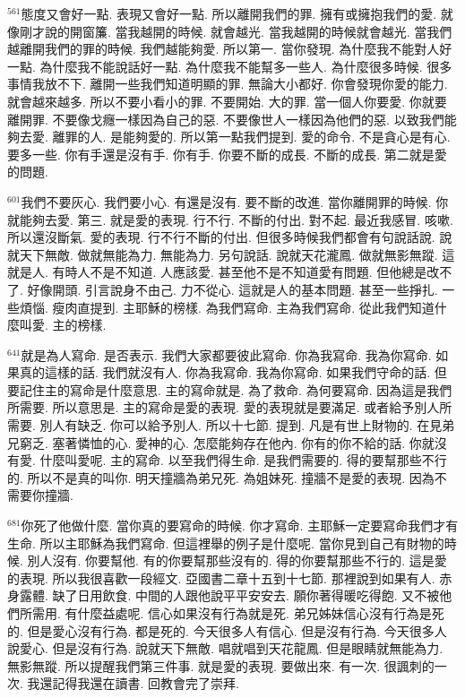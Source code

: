 \documentclass{book}
\begin{document}
$^{561}$態度又會好一點.
表現又會好一點.
所以離開我們的罪.
擁有或擁抱我們的愛.
就像剛才說的開窗簾.
當我越開的時候.
就會越光.
當我越開的時候就會越光.
當我們越離開我們的罪的時候.
我們越能夠愛.
所以第一.
當你發現.
為什麼我不能對人好一點.
為什麼我不能說話好一點.
為什麼我不能幫多一些人.
為什麼很多時候.
很多事情我放不下.
離開一些我們知道明顯的罪.
無論大小都好.
你會發現你愛的能力.
就會越來越多.
所以不要小看小的罪.
不要開始.
大的罪.
當一個人你要愛.
你就要離開罪.
不要像戈癮一樣因為自己的惡.
不要像世人一樣因為他們的惡.
以致我們能夠去愛.
離罪的人.
是能夠愛的.
所以第一點我們提到.
愛的命令.
不是貪心是有心.
要多一些.
你有手還是沒有手.
你有手.
你要不斷的成長.
不斷的成長.
第二就是愛的問題.

$^{601}$我們不要灰心.
我們要小心.
有還是沒有.
要不斷的改進.
當你離開罪的時候.
你就能夠去愛.
第三.
就是愛的表現.
行不行.
不斷的付出.
對不起.
最近我感冒.
咳嗽.
所以還沒斷氣.
愛的表現.
行不行不斷的付出.
但很多時候我們都會有句說話說.
說就天下無敵.
做就無能為力.
無能為力.
另句說話.
說就天花瀧鳳.
做就無影無蹤.
這就是人.
有時人不是不知道.
人應該愛.
甚至他不是不知道愛有問題.
但他總是改不了.
好像開頭.
引言說身不由己.
力不從心.
這就是人的基本問題.
甚至一些掙扎.
一些煩惱.
瘦肉直提到.
主耶穌的榜樣.
為我們寫命.
主為我們寫命.
從此我們知道什麼叫愛.
主的榜樣.

$^{641}$就是為人寫命.
是否表示.
我們大家都要彼此寫命.
你為我寫命.
我為你寫命.
如果真的這樣的話.
我們就沒有人.
你為我寫命.
我為你寫命.
如果我們守命的話.
但要記住主的寫命是什麼意思.
主的寫命就是.
為了救命.
為何要寫命.
因為這是我們所需要.
所以意思是.
主的寫命是愛的表現.
愛的表現就是要滿足.
或者給予別人所需要.
別人有缺乏.
你可以給予別人.
所以十七節.
提到.
凡是有世上財物的.
在見弟兄窮乏.
塞著憐恤的心.
愛神的心.
怎麼能夠存在他內.
你有的你不給的話.
你就沒有愛.
什麼叫愛呢.
主的寫命.
以至我們得生命.
是我們需要的.
得的要幫那些不行的.
所以不是真的叫你.
明天撞牆為弟兄死.
為姐妹死.
撞牆不是愛的表現.
因為不需要你撞牆.

$^{681}$你死了他做什麼.
當你真的要寫命的時候.
你才寫命.
主耶穌一定要寫命我們才有生命.
所以主耶穌為我們寫命.
但這裡舉的例子是什麼呢.
當你見到自己有財物的時候.
別人沒有.
你要幫他.
有的你要幫那些沒有的.
得的你要幫那些不行的.
這是愛的表現.
所以我很喜歡一段經文.
亞國書二章十五到十七節.
那裡說到如果有人.
赤身露體.
缺了日用飲食.
中間的人跟他說平平安安去.
願你著得暖吃得飽.
又不被他們所需用.
有什麼益處呢.
信心如果沒有行為就是死.
弟兄姊妹信心沒有行為是死的.
但是愛心沒有行為.
都是死的.
今天很多人有信心.
但是沒有行為.
今天很多人說愛心.
但是沒有行為.
說就天下無敵.
唱就唱到天花龍鳳.
但是眼睛就無能為力.
無影無蹤.
所以提醒我們第三件事.
就是愛的表現.
要做出來.
有一次.
很諷刺的一次.
我還記得我還在讀書.
回教會完了崇拜.
\end{document}
